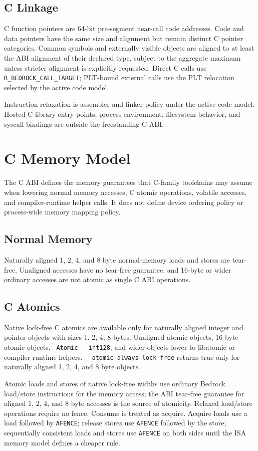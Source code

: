 \documentclass[10pt,twoside]{article}
\begin{document}
\subsection{C Linkage}
C function pointers are 64-bit pre-segment near-call code addresses. Code and
data pointers have the same size and alignment but remain distinct C pointer
categories. Common symbols and externally visible objects are aligned to at
least the ABI alignment of their declared type, subject to the aggregate maximum
unless stricter alignment is explicitly requested. Direct C calls use
\texttt{R\_\allowbreak{}BEDROCK\_\allowbreak{}CALL\_\allowbreak{}TARGET}; PLT-bound external calls use the PLT relocation
selected by the active code model.

Instruction relaxation is assembler and linker policy under the active code
model. Hosted C library entry points, process environment, filesystem behavior,
and syscall bindings are outside the freestanding C ABI.


\clearpage
\section{C Memory Model}
The C ABI defines the memory guarantees that C-family toolchains may assume
when lowering normal memory accesses, C atomic operations, volatile accesses,
and compiler-runtime helper calls. It does not define device ordering policy or
process-wide memory mapping policy.

\subsection{Normal Memory}
Naturally aligned 1, 2, 4, and 8 byte normal-memory loads and stores are
tear-free. Unaligned accesses have no tear-free guarantee, and 16-byte or wider
ordinary accesses are not atomic as single C ABI operations.

\subsection{C Atomics}
Native lock-free C atomics are available only for naturally aligned integer and
pointer objects with sizes 1, 2, 4, 8 bytes. Unaligned atomic objects,
16-byte atomic objects, \texttt{\_Atomic \_\_int128}, and wider objects lower to
libatomic or compiler-runtime helpers.
\texttt{\_\_atomic\_always\_lock\_free} returns true only for naturally aligned
1, 2, 4, and 8 byte objects.

Atomic loads and stores of native lock-free widths use ordinary Bedrock
load/store instructions for the memory access; the ABI tear-free guarantee for
aligned 1, 2, 4, and 8 byte accesses is the source of atomicity. Relaxed
load/store operations require no fence. Consume is treated as acquire. Acquire
loads use a load followed by \texttt{AFENCE}; release stores use
\texttt{AFENCE} followed by the store; sequentially consistent loads and stores
use \texttt{AFENCE} on both sides until the ISA memory model defines a cheaper
rule.
\end{document}
